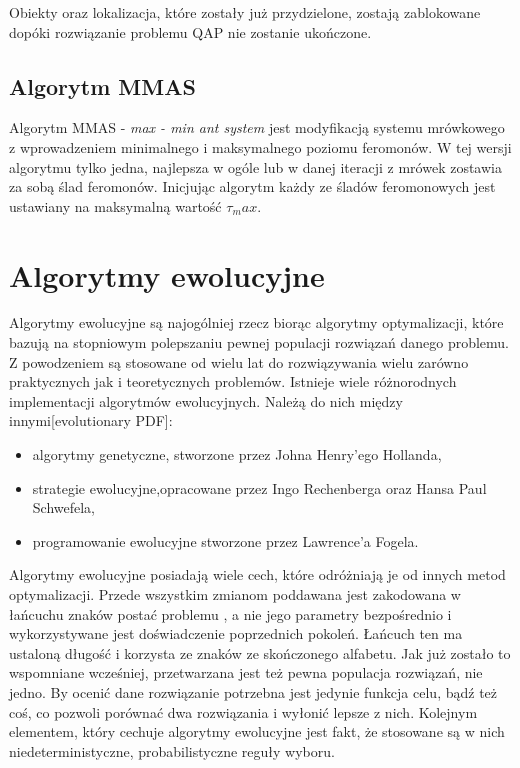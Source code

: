 Obiekty oraz lokalizacja, które zostały już przydzielone, zostają zablokowane dopóki rozwiązanie problemu QAP nie zostanie ukończone.

\subsection{Algorytm MMAS}
Algorytm MMAS - \textit{max - min ant system} jest modyfikacją systemu mrówkowego z wprowadzeniem minimalnego i maksymalnego poziomu feromonów. W tej wersji algorytmu tylko jedna, najlepsza w ogóle lub w danej iteracji z mrówek zostawia za sobą ślad feromonów. Inicjując algorytm każdy ze śladów feromonowych jest ustawiany na maksymalną wartość $\tau_max$. 

\section{Algorytmy ewolucyjne}
\label{sec:AE}

Algorytmy ewolucyjne są najogólniej rzecz biorąc algorytmy optymalizacji, które bazują na stopniowym polepszaniu pewnej populacji rozwiązań danego problemu. Z powodzeniem są stosowane od wielu lat do rozwiązywania wielu zarówno praktycznych jak i teoretycznych problemów. Istnieje wiele różnorodnych implementacji algorytmów ewolucyjnych. Należą do nich między innymi[evolutionary PDF]:
\begin{itemize}
\item algorytmy genetyczne, stworzone przez Johna Henry'ego Hollanda,
\item strategie ewolucyjne,opracowane przez Ingo Rechenberga oraz Hansa Paul Schwefela,
\item programowanie ewolucyjne stworzone przez Lawrence'a Fogela.
\end{itemize}

Algorytmy ewolucyjne posiadają wiele cech, które odróżniają je od innych metod optymalizacji. Przede wszystkim zmianom poddawana jest zakodowana w łańcuchu znaków postać problemu , a nie jego parametry bezpośrednio i wykorzystywane jest doświadczenie poprzednich pokoleń. Łańcuch ten ma ustaloną długość i korzysta ze znaków ze skończonego alfabetu. Jak już zostało to wspomniane wcześniej, przetwarzana jest też pewna populacja rozwiązań, nie jedno. By ocenić dane rozwiązanie potrzebna jest jedynie funkcja celu, bądź też coś, co pozwoli porównać dwa rozwiązania i wyłonić lepsze z nich. Kolejnym elementem, który cechuje algorytmy ewolucyjne jest fakt, że stosowane są w nich niedeterministyczne, probabilistyczne reguły wyboru.

